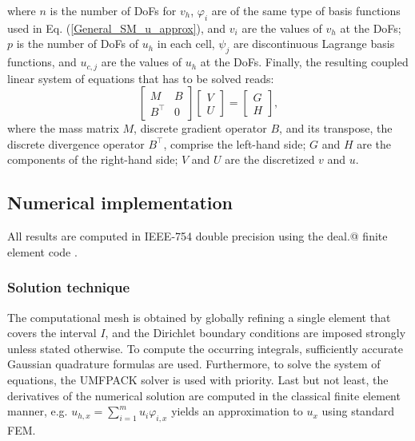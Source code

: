 \documentclass[review,3p]{elsarticle}
\makeatletter
\newcommand*{\rom}[1]{\expandafter\@slowromancap\romannumeral #1@}
\makeatother
\begin{document}
where $n$ is the number of DoFs for $v_h$, $\varphi _{i}$ are of the same type of basis functions used in Eq. (\ref{General_SM_u_approx}), and $v_i$ are the values of $v_h$ at the DoFs; $p$ is the number of DoFs of $u_h$ in each cell, $\psi _{j}$ are discontinuous Lagrange basis functions, and $u_{c,j}$ are the values of $u_h$ at the DoFs. 
Finally, the resulting coupled linear system of equations that has to be solved reads:
\begin{equation}
 \left[ \begin{array}{cc} M & B  \\ B^\top & 0 \end{array}\right] \left[ \begin{array}{cc} {V} \\ {U} \end{array}\right] =\left[ \begin{array}{cc} G \\ H \end{array}\right], \label{matrix equation mix FEM}
\end{equation}
where the mass matrix $M$, discrete gradient operator $B$, and its transpose, the discrete divergence operator $B^\top$, comprise the left-hand side; $G$ and $H$ are the components of the right-hand side; $V$ and $U$ are the discretized $v$ and $u$.

\subsection{Numerical implementation}

All results are computed in IEEE-754 double precision \cite{zuras2008ieee} using the deal.\rom{2} finite element code \cite{alzetta2018deal}.

\subsubsection{Solution technique}

The computational mesh is obtained by globally refining a single element that covers the interval $I$, and the Dirichlet boundary conditions are imposed strongly unless stated otherwise.
To compute the occurring integrals, sufficiently accurate Gaussian quadrature formulas are used. 
Furthermore, to solve the system of equations, the UMFPACK solver \cite{davis2004algorithm} is used with priority. Last but not least, the derivatives of the numerical solution are computed in the classical finite element manner, e.g. $u_{h,x}=\sum\limits _{i=1}^m u_i\varphi_{i,x}$ yields an approximation to $u_x$ using standard FEM. 
\end{document}
